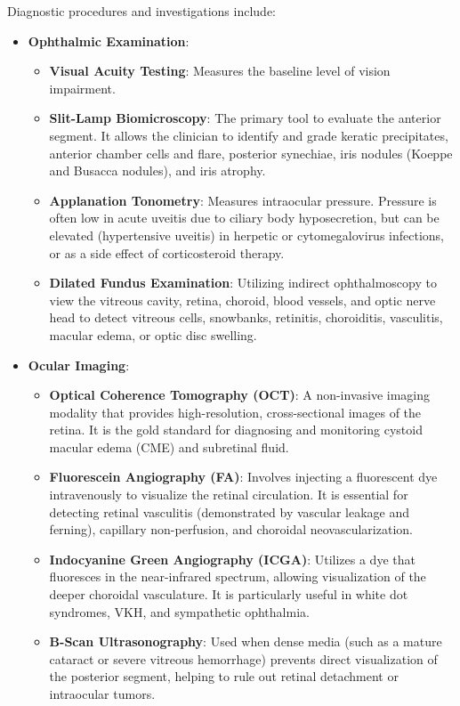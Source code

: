 Diagnostic procedures and investigations include:
\begin{itemize}
    \item \textbf{Ophthalmic Examination}:
    \begin{itemize}
        \item \textbf{Visual Acuity Testing}: Measures the baseline level of vision impairment.
        \item \textbf{Slit-Lamp Biomicroscopy}: The primary tool to evaluate the anterior segment. It allows the clinician to identify and grade keratic precipitates, anterior chamber cells and flare, posterior synechiae, iris nodules (Koeppe and Busacca nodules), and iris atrophy.
        \item \textbf{Applanation Tonometry}: Measures intraocular pressure. Pressure is often low in acute uveitis due to ciliary body hyposecretion, but can be elevated (hypertensive uveitis) in herpetic or cytomegalovirus infections, or as a side effect of corticosteroid therapy.
        \item \textbf{Dilated Fundus Examination}: Utilizing indirect ophthalmoscopy to view the vitreous cavity, retina, choroid, blood vessels, and optic nerve head to detect vitreous cells, snowbanks, retinitis, choroiditis, vasculitis, macular edema, or optic disc swelling.
    \end{itemize}
    \item \textbf{Ocular Imaging}:
    \begin{itemize}
        \item \textbf{Optical Coherence Tomography (OCT)}: A non-invasive imaging modality that provides high-resolution, cross-sectional images of the retina. It is the gold standard for diagnosing and monitoring cystoid macular edema (CME) and subretinal fluid.
        \item \textbf{Fluorescein Angiography (FA)}: Involves injecting a fluorescent dye intravenously to visualize the retinal circulation. It is essential for detecting retinal vasculitis (demonstrated by vascular leakage and ferning), capillary non-perfusion, and choroidal neovascularization.
        \item \textbf{Indocyanine Green Angiography (ICGA)}: Utilizes a dye that fluoresces in the near-infrared spectrum, allowing visualization of the deeper choroidal vasculature. It is particularly useful in white dot syndromes, VKH, and sympathetic ophthalmia.
        \item \textbf{B-Scan Ultrasonography}: Used when dense media (such as a mature cataract or severe vitreous hemorrhage) prevents direct visualization of the posterior segment, helping to rule out retinal detachment or intraocular tumors.

\end{itemize}
\end{itemize}
